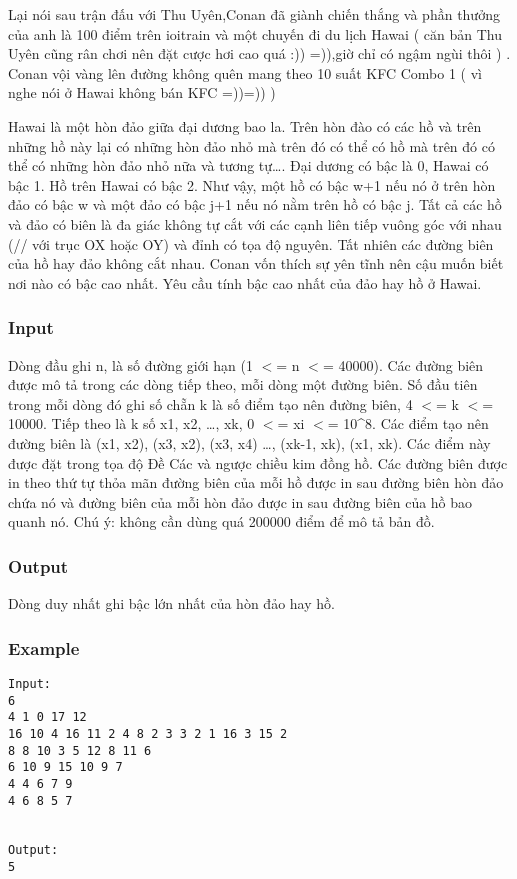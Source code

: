 



   Lại nói sau trận đấu với Thu Uyên,Conan đã giành chiến thắng và phần thưởng của anh là 100 điểm trên ioitrain và một chuyến đi du lịch Hawai ( căn bản Thu Uyên cũng rân chơi nên đặt cược hơi cao quá :)) =)),giờ chỉ có ngậm ngùi thôi ) . Conan vội vàng lên đường không quên mang theo 10 suất KFC Combo 1 ( vì nghe nói ở Hawai không bán KFC =))=)) )  

   Hawai là một hòn đảo giữa đại dương bao la. Trên hòn đào có các hồ và trên những hồ này lại có những hòn đảo nhỏ mà trên đó có thể có hồ mà trên đó có thể có những hòn đảo nhỏ nữa và tương tự…. Đại dương có bậc là 0, Hawai có bậc 1. Hồ trên Hawai có bậc 2. Như vậy, một hồ có bậc w+1 nếu nó ở trên hòn đảo có bậc w và một đảo có bậc j+1 nếu nó nằm trên hồ có bậc j. Tất cả các hồ và đảo có biên là đa giác không tự cắt với các cạnh liên tiếp vuông góc với nhau (// với trục OX hoặc OY) và đỉnh có tọa độ nguyên. Tất nhiên các đường biên của hồ hay đảo không cắt nhau. Conan vốn thích sự yên tĩnh nên cậu muốn biết nơi nào có bậc cao nhất. Yêu cầu tính bậc cao nhất của đảo hay hồ ở Hawai.  

\subsubsection{   Input  }  Dòng đầu ghi n, là số đường giới hạn (1 $<$= n $<$= 40000).  Các đường biên được mô tả trong các dòng tiếp theo, mỗi dòng một đường biên. Số đầu tiên trong mỗi dòng đó ghi số chẵn k là số điểm tạo nên đường biên, 4 $<$= k $<$= 10000. Tiếp theo là k số x1, x2, …, xk, 0 $<$= xi $<$= 10\textasciicircum8. Các điểm tạo nên đường biên là (x1, x2), (x3, x2), (x3, x4) …, (xk-1, xk), (x1, xk). Các điểm này được đặt trong tọa độ Đề Các và ngược chiều kim đồng hồ. Các đường biên được in theo thứ tự thỏa mãn đường biên của mỗi hồ được in sau đường biên hòn đảo chứa nó và đường biên của mỗi hòn đảo được in sau đường biên của hồ bao quanh nó. Chú ý: không cần dùng quá 200000 điểm để mô tả bản đồ.  

\subsubsection{   Output  }  Dòng duy nhất ghi bậc lớn nhất của hòn đảo hay hồ.  

\subsubsection{   Example  }
\begin{verbatim}
Input:
6
4 1 0 17 12
16 10 4 16 11 2 4 8 2 3 3 2 1 16 3 15 2
8 8 10 3 5 12 8 11 6
6 10 9 15 10 9 7
4 4 6 7 9
4 6 8 5 7


Output:
5
\end{verbatim}